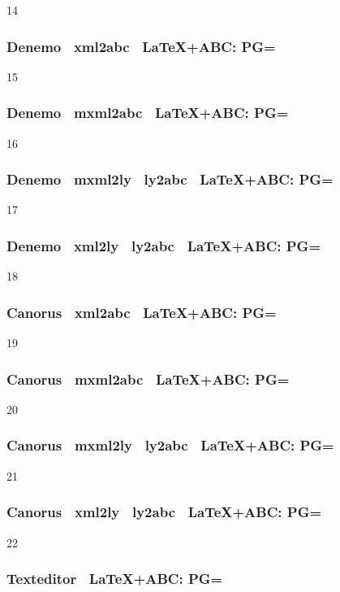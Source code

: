 14

\subsubsection{Denemo \ra\ xml2abc \ra\ \LaTeX+ABC: PG=}

15

\subsubsection{Denemo \ra\ mxml2abc \ra\ \LaTeX+ABC: PG=} 

16

\subsubsection{Denemo \ra\ mxml2ly \ra\ ly2abc \ra\ \LaTeX+ABC: PG=} 

17

\subsubsection{Denemo \ra\ xml2ly \ra\ ly2abc \ra\ \LaTeX+ABC: PG=} 

18

\subsubsection{Canorus \ra\ xml2abc \ra\ \LaTeX+ABC: PG=} 

19

\subsubsection{Canorus \ra\ mxml2abc \ra\ \LaTeX+ABC: PG=} 

20

\subsubsection{Canorus \ra\ mxml2ly \ra\ ly2abc \ra\ \LaTeX+ABC: PG=} 

21

\subsubsection{Canorus \ra\ xml2ly \ra\ ly2abc \ra\ \LaTeX+ABC: PG=} 

22

\subsubsection{Texteditor \ra\ \LaTeX+ABC: PG=}

